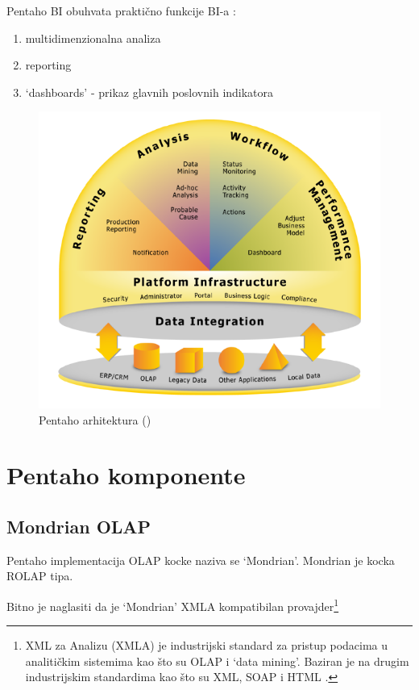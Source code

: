 \documentclass[times, utf8, seminar]{fit}
\begin{document}
Pentaho BI obuhvata praktično funkcije BI-a \cite[str.~7]{pentaho32}:

\begin{enumerate}
 \item multidimenzionalna analiza
 \item reporting
 \item `dashboards' - prikaz glavnih poslovnih indikatora
\end{enumerate}

\begin{figure}[H]
\centering
\includegraphics[width=12cm]{img/pentaho_arhitektura_eric.png}
\caption{Pentaho arhitektura (\cite{web:eric})}
\end{figure}

\section{Pentaho komponente}
\label{sect:pentaho}

\subsection{Mondrian OLAP}

Pentaho implementacija OLAP kocke naziva se `Mondrian'. Mondrian je kocka ROLAP tipa.

Bitno je naglasiti da je `Mondrian'  XMLA kompatibilan provajder\footnote{XML za Analizu (XMLA) je industrijski standard za pristup podacima u analitičkim sistemima kao što su OLAP i `data mining'. Baziran je na drugim industrijskim standardima kao što su XML, SOAP i HTML \cite{web:wikipedia:xmla}.}
\end{document}
